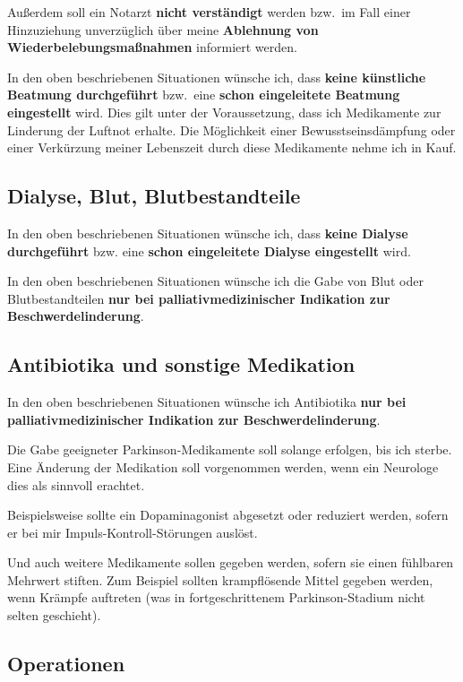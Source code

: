 \documentclass[pdftex,12pt,a4paper]{article}
\begin{document}
Außerdem soll ein Notarzt \textbf{nicht verständigt} werden bzw.\ im Fall
einer Hinzuziehung unverzüglich über meine \textbf{Ablehnung von Wiederbelebungsmaßnahmen} informiert werden.


In den oben beschriebenen Situationen wünsche ich,
dass \textbf{keine künstliche Beatmung durchgeführt} bzw.\ 
 eine \textbf{schon eingeleitete Beatmung eingestellt} wird.
 Dies gilt unter der Voraussetzung, dass ich Medikamente zur Linderung der Luftnot erhalte. Die Möglichkeit einer Bewusstseinsdämpfung oder einer Verkürzung meiner Lebenszeit durch diese Medikamente nehme ich in Kauf.

\subsection{Dialyse, Blut, Blutbestandteile}

In den oben beschriebenen Situationen wünsche ich,
dass \textbf{keine Dialyse durchgeführt} bzw. eine \textbf{schon 
eingeleitete Dialyse eingestellt} wird.

In den oben beschriebenen Situationen wünsche ich
die Gabe von Blut oder Blutbestandteilen
\textbf{nur bei palliativmedizinischer Indikation zur Beschwerdelinderung}.
  
\subsection{Antibiotika und sonstige Medikation}

In den oben beschriebenen Situationen wünsche ich
Antibiotika \textbf{nur bei palliativmedizinischer Indikation zur Beschwerdelinderung}.

Die Gabe geeigneter Parkinson-Medikamente soll solange erfolgen, bis
ich sterbe. Eine Änderung der Medikation soll vorgenommen werden,
wenn ein Neurologe dies als sinnvoll erachtet.

Beispielsweise sollte ein Dopaminagonist abgesetzt oder reduziert werden, sofern er bei mir Impuls-Kontroll-Störungen auslöst.

Und auch weitere Medikamente sollen gegeben werden, sofern sie einen
fühlbaren Mehrwert stiften. Zum Beispiel sollten krampflösende 
Mittel gegeben werden, wenn Krämpfe auftreten (was in fortgeschrittenem Parkinson-Stadium nicht selten geschieht).


\subsection{Operationen}
\end{document}
